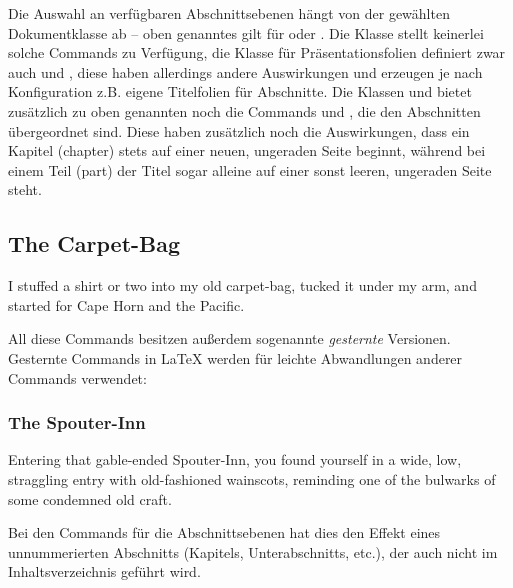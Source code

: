 Die Auswahl an verfügbaren Abschnittsebenen hängt von der gewählten Dokumentklasse ab -- oben genanntes gilt für  oder .
Die Klasse  stellt keinerlei solche Commands zu Verfügung, die Klasse  für Präsentationsfolien definiert zwar auch  und , diese haben allerdings andere Auswirkungen und erzeugen je nach Konfiguration z.B. eigene Titelfolien für Abschnitte.
Die Klassen  und  bietet zusätzlich zu oben genannten noch die Commands  und , die den Abschnitten übergeordnet sind.
Diese haben zusätzlich noch die Auswirkungen, dass ein Kapitel (chapter) stets auf einer neuen, ungeraden Seite beginnt, während bei einem Teil (part) der Titel sogar alleine auf einer sonst leeren, ungeraden Seite steht.
\begin{latexlisting}
	\chapter{The Carpet-Bag}
	I stuffed a shirt or two into my old carpet-bag, tucked it under my arm, and started for Cape Horn and the Pacific.
\end{latexlisting}
All diese Commands besitzen außerdem sogenannte \emph{gesternte} Versionen.
Gesternte Commands in \LaTeX{} werden für leichte Abwandlungen anderer Commands verwendet:
\begin{latexlisting}
	\subsection*{The Spouter-Inn}
	Entering that gable-ended Spouter-Inn, you found yourself in a wide, low, straggling entry with old-fashioned wainscots, reminding one of the bulwarks of some condemned old craft.
\end{latexlisting}
Bei den Commands für die Abschnittsebenen hat dies den Effekt eines unnummerierten Abschnitts (Kapitels, Unterabschnitts, etc.), der auch nicht im Inhaltsverzeichnis geführt wird.

